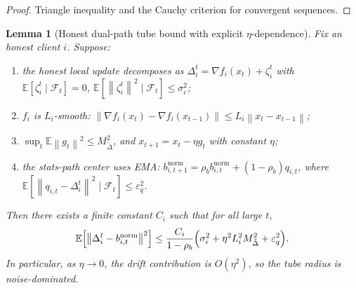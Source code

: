 \documentclass[11pt,a4paper]{article}
\newtheorem{lemma}{Lemma}
\theoremstyle{remark}
\newcommand{\E}{\mathbb{E}}
\newcommand{\F}{\mathcal{F}}
\newcommand{\norm}[1]{\left\lVert #1 \right\rVert}
\begin{document}
\begin{proof}
Triangle inequality and the Cauchy criterion for convergent sequences.
\end{proof}

\begin{lemma}[Honest dual-path tube bound with explicit \(\eta\)-dependence]
\label{lem:honest_tube_eta}
Fix an honest client \(i\). Suppose:
\begin{enumerate}[label=(\roman*)]
    \item the honest local update decomposes as
    \(\Delta_i^t=\nabla f_i(x_t)+\zeta_i^t\) with
    \(\E[\zeta_i^t\mid\F_t]=0\),
    \(\E\!\left[\norm{\zeta_i^t}^2\mid\F_t\right]\le \sigma_i^2\);
    \item \(f_i\) is \(L_i\)-smooth:
    \(\norm{\nabla f_i(x_t)-\nabla f_i(x_{t-1})}\le L_i\norm{x_t-x_{t-1}}\);
    \item \(\sup_t \E\norm{g_t}^2 \le M_{\tilde\Delta}^2\), and \(x_{t+1}=x_t-\eta g_t\)
    with constant \(\eta\);
    \item the stats-path center uses EMA:
    \(b_{i,t+1}^{\mathrm{norm}}=\rho_b b_{i,t}^{\mathrm{norm}}+(1-\rho_b)q_{i,t}\),
    where \(\E\!\left[\norm{q_{i,t}-\Delta_i^t}^2\mid\F_t\right]\le \varepsilon_q^2\).
\end{enumerate}
Then there exists a finite constant \(C_i\) such that for all large \(t\),
\begin{equation}
    \E\!\left[\norm{\Delta_i^t-b_{i,t}^{\mathrm{norm}}}^2\right]
    \le
    \frac{C_i}{1-\rho_b}
    \Bigl(
        \sigma_i^2 + \eta^2 L_i^2 M_{\tilde\Delta}^2 + \varepsilon_q^2
    \Bigr).
    \label{eq:honest_tube_eta}
\end{equation}
In particular, as \(\eta\to 0\), the drift contribution is
\(O(\eta^2)\), so the tube radius is noise-dominated.
\end{lemma}
\end{document}
